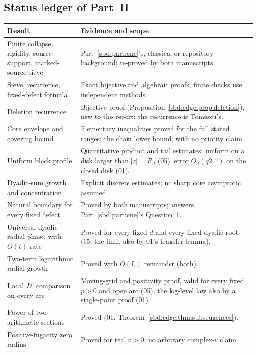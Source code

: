 \documentclass[11pt,a4paper]{article}
\theoremstyle{definition}
\begin{document}
\clearpage
\subsection{Status ledger of Part~II}
\begin{longtable}{p{}p{}}
\toprule
Result & Evidence and scope\\
\midrule\endhead
Finite collapse, rigidity, source support, marked-source sieve &
Part~\ref{sbd:part:one}'s, classical or repository background; re-proved by
both manuscripts.\\
Sieve, recurrence, fixed-defect formula & Exact bijective and algebraic
proofs; finite checks use independent methods.\\
Deletion recurrence & Bijective proof (Proposition~\ref{sbd:edge:prop:deletion}),
new to the report; the recurrence is Tomescu's.\\
Core envelope and covering bound & Elementary inequalities proved for the
full stated ranges; the chain lower bound, with no priority claim.\\
Uniform block profile & Quantitative product and tail estimates; uniform on
a disk larger than $|z|=R_d$ (05); error $O_d(q2^{-q})$ on the closed disk
(01).\\
Dyadic-sum growth and concentration & Explicit discrete estimates; no sharp
core asymptotic assumed.\\
Natural boundary for every fixed defect & Proved by both manuscripts;
answers Part~\ref{sbd:part:one}'s Question~1.\\
Universal dyadic radial phase, with $O(t)$ rate & Proved for every fixed $d$
and every fixed dyadic root (05; the limit also by 01's transfer lemma).\\
Two-term logarithmic radial growth & Proved with $O(L)$ remainder (both).\\
Local $L^p$ comparison on every arc & Moving-grid and positivity proof,
valid for every fixed $p>0$ and open arc (05); the log-level law also by a
single-point proof (01).\\
Power-of-two arithmetic sections & Proved (01,
Theorem~\ref{sbd:edge:thm:subsequences}).\\
Positive-fugacity zero radius & Proved for real $v>0$; no arbitrary
complex-$v$ claim.\\

\end{longtable}
\end{document}
